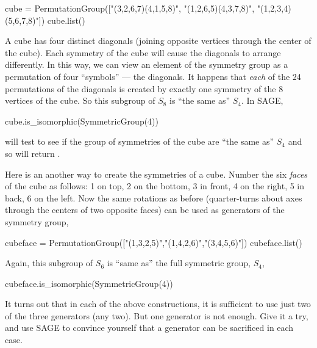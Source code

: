 \documentclass[12pt]{article}
\newcommand{\sageinline}[1]{\lit*{#1}}
\begin{document}
%
\begin{sageverbatim}
cube = PermutationGroup(["(3,2,6,7)(4,1,5,8)", 
                         "(1,2,6,5)(4,3,7,8)", "(1,2,3,4)(5,6,7,8)"])
cube.list()
\end{sageverbatim}
%
\par
A cube has four distinct diagonals (joining opposite vertices through the center of the cube).  Each symmetry of the cube will cause the diagonals to arrange differently. In this way, we can view an element of the symmetry group as a permutation of four ``symbols'' --- the diagonals.  It happens that {\em each} of the 24 permutations of the diagonals is created by exactly one symmetry of the 8 vertices of the cube.  So this subgroup of $S_8$ is ``the same as'' $S_4$.  In SAGE, 
%
\begin{sageverbatim}
cube.is_isomorphic(SymmetricGroup(4))
\end{sageverbatim}
%
will test to see if the group of symmetries of the cube are ``the same as'' $S_4$ and so will return \sageinline{True}.\par
%
Here is an another way to create the symmetries of a cube.  Number the six {\em faces} of the cube as follows:  1 on top, 2 on the bottom, 3 in front, 4 on the right, 5 in back, 6 on the left.  Now the same rotations as before (quarter-turns about axes through the centers of two opposite faces) can be used as generators of the symmetry group,
%
\begin{sageverbatim}
cubeface = PermutationGroup(["(1,3,2,5)","(1,4,2,6)","(3,4,5,6)"])
cubeface.list()
\end{sageverbatim}
%
Again, this subgroup of $S_6$ is ``same as'' the full symmetric group, $S_4$,
%
\begin{sageverbatim}
cubeface.is_isomorphic(SymmetricGroup(4))
\end{sageverbatim}
%
It turns out that in each of the above constructions, it is sufficient to use just two of the three generators (any two).  But one generator is not enough.  Give it a try, and use SAGE to convince yourself that a generator can be sacrificed in each case.
%
\end{document}
